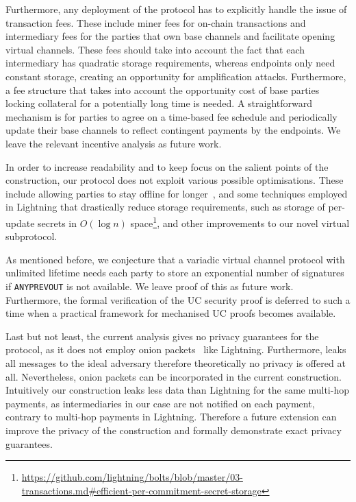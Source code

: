   Furthermore, any deployment of the protocol has to explicitly handle the issue
  of transaction fees. These include miner fees for on-chain transactions and
  intermediary fees for the parties that own base channels and facilitate
  opening virtual channels. These fees should take into account the fact that
  each intermediary has quadratic storage requirements, whereas endpoints only
  need constant storage, creating an opportunity for amplification attacks.
  Furthermore, a fee structure that takes into account the opportunity cost of
  base parties locking collateral for a potentially long time is needed. A
  straightforward mechanism is for parties to agree on a time-based fee schedule
  and periodically update their base channels to reflect contingent payments by
  the endpoints. We leave the relevant incentive analysis as future work.

  In order to increase readability and to keep focus on the salient points of
  the construction, our protocol does not exploit various possible
  optimisations. These include allowing parties to stay offline for
  longer~\cite{DBLP:conf/ccs/AumayrTMMM22}, and some techniques employed in Lightning that
  drastically reduce storage requirements, such as storage of per-update secrets
  in $O(\log n)$
  space\footnote{\url{https://github.com/lightning/bolts/blob/master/03-transactions.md\#efficient-per-commitment-secret-storage}},
  and other improvements to our novel virtual subprotocol.

  As mentioned before, we conjecture that a variadic virtual
  channel protocol with unlimited lifetime needs each party to store an
  exponential number of signatures if \texttt{ANYPREVOUT} is not available. We
  leave proof of this as future work. Furthermore, the formal verification of
  the UC security proof is deferred to such a time when a practical framework
  for mechanised UC proofs becomes available.

  Last but not least, the current analysis gives no privacy guarantees for the
  protocol, as it does not employ onion packets~\cite{sphinx} like Lightning.
  Furthermore, \fchan leaks all messages to the ideal adversary therefore
  theoretically no privacy is offered at all. Nevertheless, onion packets can be
  incorporated in the current construction. Intuitively our construction
  leaks less data than Lightning for the same multi-hop payments, as
  intermediaries in our case are not notified on each payment, contrary to
  multi-hop payments in Lightning. Therefore a future extension can improve the
  privacy of the construction and formally demonstrate exact privacy guarantees.
